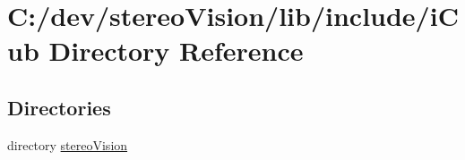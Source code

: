 \section{C\+:/dev/stereo\+Vision/lib/include/i\+Cub Directory Reference}
\label{dir_05906369c2d654c318c8e5f0b9121080}
\subsection*{Directories}
\begin{DoxyCompactItemize}
\item 
directory \hyperlink{dir_50bad1a883b2386a62f50ea4f4f2f861}{stereo\+Vision}
\end{DoxyCompactItemize}
